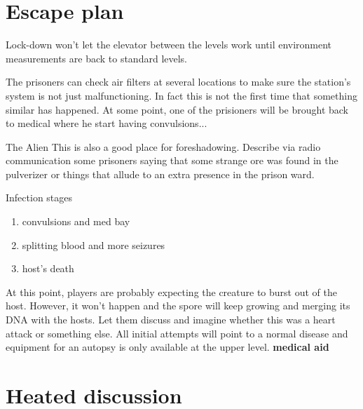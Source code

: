 \newpage

\section{Escape plan}


\begin{rpg-commentbox}{}
    Lock-down won't let the elevator between the levels work until environment measurements are back to standard levels.
    
    
    The prisoners can check air filters at several locations to make sure the station's system is not just malfunctioning. In fact this is not the first time that something similar has happened. At some point, one of the prisioners will be brought back to medical where he start having convulsions...

\end{rpg-commentbox}

\begin{rpg-commentbox}{The Alien}
    This is also a good place for foreshadowing. Describe via radio communication some prisoners saying that some strange ore was found in the pulverizer or things that allude to an extra presence in the prison ward.
 \end{rpg-commentbox}




\begin{rpg-commentbox}{Infection stages}
    \begin{enumerate}
        \item convulsions and med bay
        \item splitting blood and more seizures
        \item host's death
    \end{enumerate}

    At this point, players are probably expecting the creature to burst out of the host. However, it won't happen and the spore will keep growing and merging its DNA with the hosts. Let them discuss and imagine whether this was a heart attack or something else. All initial attempts will point to a normal disease and equipment for an autopsy is only available at the upper level.  \textbf{medical aid}

\end{rpg-commentbox}





\newsect

\section{Heated discussion}


